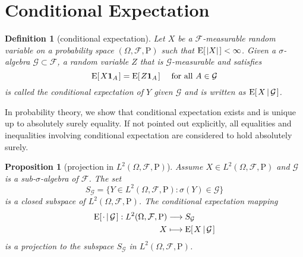 \documentclass{report}
\newcommand\expt[1]{\mathrm{E}\mleft[\hspace{1pt}#1\hspace{1pt}\mright]}
\newcommand\coex[2]{\mathrm{E}\mleft[\hspace{1pt}#1\,\middle|\, #2\hspace{1pt}\mright]}
\newtheorem{definition}{Definition}[section]
\newtheorem{proposition}{Proposition}[section]
\theoremstyle{nonumberplain}
\begin{document}
\section{Conditional Expectation}
\begin{definition}[conditional expectation]
	Let $X$ be a $\mathcal{F}$-measurable random variable on a probability space $(\Omega,\mathcal{F},\mathrm{P})$ such that $\expt{\left|X\right|} < \infty$. Given a $\sigma$-algebra $\mathcal{G}\subset\mathcal{F}$, a random variable $Z$ that is $\mathcal{G}$-measurable and satisfies 
	\[
	\expt{X\mathbf{1}_A} = \expt{Z\mathbf{1}_A} \quad\text{ for all }A \in \mathcal{G}
	\] 
	is called the \emph{conditional expectation} of $Y$ given $\mathcal{G}$ and is written as $\coex{X}{\mathcal{G}}$.
\end{definition}
In probability theory, we show that conditional expectation exists and is unique up to absolutely surely equality. If not pointed out explicitly, all equalities and inequalities involving conditional expectation are considered to hold absolutely surely. 

\begin{proposition}[projection in $L^2(\Omega,\mathcal{F},\mathrm{P})$]
	Assume $X\in L^2(\Omega,\mathcal{F},\mathrm{P})$ and $\mathcal{G}$ is a sub-$\sigma$-algebra of $\mathcal{F}$. The set
	\[
	S_\mathcal{G}=\{Y\in L^2(\Omega,\mathcal{F},\mathrm{P}):\sigma(Y)\in \mathcal{G}\}
	\]
	is a closed subspace of $L^2(\Omega,\mathcal{F},\mathrm{P})$.
	The conditional expectation mapping
	\begin{align*}
	\coex{\cdot}{\mathcal{G}}:L^2(\Omega,\mathcal{F},\mathrm{P})&\longrightarrow S_\mathcal{G}\\
	X&\longmapsto \coex{X}{\mathcal{G}}
	\end{align*}
	is a projection to the subspace $S_\mathcal{G}$ in $L^2(\Omega,\mathcal{F},\mathrm{P})$.
\end{proposition}
\end{document}
